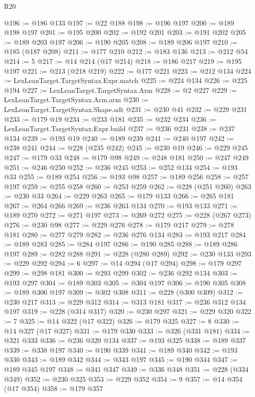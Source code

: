\begin{lexlean}{R20}
\begin{coremodule}
@196 := @186 @133
@197 := @22 @188
@198 := @196 @197
@200 := @189 @198 @197
@201 := @195 @200
@202 := @192 @201
@203 := @191 @202
@205 := @189 @203 @197
@206 := @190 @205
@208 := @189 @206 @197
@210 := @185 (@187 @208)
@211 := @177 @210
@212 := @183 @136
@213 := @212 @54
@214 := 5
@217 := @14 @214 (@17 @214)
@218 := @186 @217
@219 := @195 @197
@221 := @213 (@218 @219)
@222 := @177 @221
@223 := @212 @134
@224 := LexLeanTarget.TargetSyntax.Expr.match
@225 := @224 @134
@226 := @225 @194
@227 := LexLeanTarget.TargetSyntax.Arm
@228 := @2 @227
@229 := LexLeanTarget.TargetSyntax.Arm.arm
@230 := LexLeanTarget.TargetSyntax.Shape.adt
@231 := @230 @41
@232 := @229 @231
@233 := @179 @19
@234 := @233 @181
@235 := @232 @234
@236 := LexLeanTarget.TargetSyntax.Expr.build
@237 := @236 @231
@238 := @237 @134
@239 := @193 @19
@240 := @189 @239
@241 := @240 @197
@242 := @238 @241
@244 := @228 (@235 @242)
@245 := @230 @19
@246 := @229 @245
@247 := @179 @33
@248 := @179 @98
@249 := @248 @181
@250 := @247 @249
@251 := @246 @250
@252 := @236 @245
@253 := @252 @134
@254 := @193 @33
@255 := @189 @254
@256 := @193 @98
@257 := @189 @256
@258 := @257 @197
@259 := @255 @258
@260 := @253 @259
@262 := @228 (@251 @260)
@263 := @230 @33
@264 := @229 @263
@265 := @179 @133
@266 := @265 @181
@267 := @264 @266
@269 := @236 @263 @134
@270 := @193 @133
@271 := @189 @270
@272 := @271 @197
@273 := @269 @272
@275 := @228 (@267 @273)
@276 := @230 @98
@277 := @229 @276
@278 := @179 @217
@279 := @278 @181
@280 := @277 @279
@282 := @236 @276 @134
@283 := @193 @217
@284 := @189 @283
@285 := @284 @197
@286 := @190 @285
@288 := @189 @286 @197
@289 := @282 @288
@291 := @228 (@280 @289)
@292 := @230 @133
@293 := @229 @292
@294 := 6
@297 := @14 @294 (@17 @294)
@298 := @179 @297
@299 := @298 @181
@300 := @293 @299
@302 := @236 @292 @134
@303 := @193 @297
@304 := @189 @303
@305 := @304 @197
@306 := @190 @305
@308 := @189 @306 @197
@309 := @302 @308
@311 := @228 (@300 @309)
@312 := @230 @217
@313 := @229 @312
@314 := @313 @181
@317 := @236 @312 @134 @197
@319 := @228 (@314 @317)
@320 := @230 @297
@321 := @229 @320
@322 := 7
@325 := @14 @322 (@17 @322)
@326 := @179 @325
@327 := 8
@330 := @14 @327 (@17 @327)
@331 := @179 @330
@333 := @326 (@331 @181)
@334 := @321 @333
@336 := @236 @320 @134
@337 := @193 @325
@338 := @189 @337
@339 := @338 @197
@340 := @190 @339
@341 := @189 @340
@342 := @193 @330
@343 := @189 @342
@344 := @343 @197
@345 := @190 @344
@347 := @189 @345 @197
@348 := @341 @347
@349 := @336 @348
@351 := @228 (@334 @349)
@352 := @230 @325
@353 := @229 @352
@354 := 9
@357 := @14 @354 (@17 @354)
@358 := @179 @357

\end{coremodule}
\end{lexlean}
